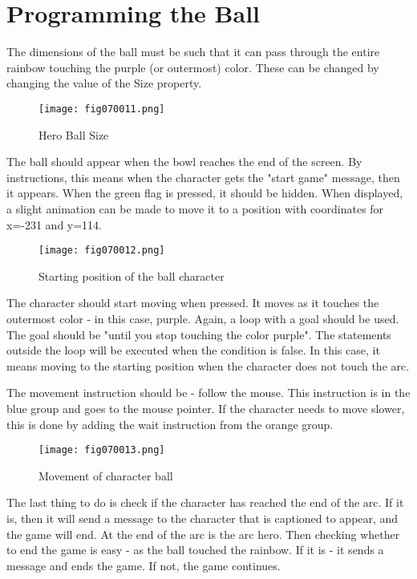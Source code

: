\section{Programming the Ball}
The dimensions of the ball must be such that it can pass through the entire rainbow touching the purple (or outermost) color. These can be changed by changing the value of the Size property.

\begin{figure}[H]
   \centering
   \texttt{[image: fig070011.png]}
   \caption{Hero Ball Size}
\label{fig070011}
\end{figure}

The ball should appear when the bowl reaches the end of the screen. By instructions, this means when the character gets the "start game" message, then it appears. When the green flag is pressed, it should be hidden. When displayed, a slight animation can be made to move it to a position with coordinates for x=-231 and y=114.

\begin{figure}[H]
   \centering
   \texttt{[image: fig070012.png]}
   \caption{Starting position of the ball character}
\label{fig070012}
\end{figure}

The character should start moving when pressed. It moves as it touches the outermost color - in this case, purple. Again, a loop with a goal should be used. The goal should be "until you stop touching the color purple". The statements outside the loop will be executed when the condition is false. In this case, it means moving to the starting position when the character does not touch the arc.

The movement instruction should be - follow the mouse. This instruction is in the blue group and goes to the mouse pointer. If the character needs to move slower, this is done by adding the wait instruction from the orange group.

\begin{figure}[H]
   \centering
   \texttt{[image: fig070013.png]}
   \caption{Movement of character ball}
\label{fig070013}
\end{figure}

The last thing to do is check if the character has reached the end of the arc. If it is, then it will send a message to the character that is captioned to appear, and the game will end. At the end of the arc is the arc hero. Then checking whether to end the game is easy - as the ball touched the rainbow. If it is - it sends a message and ends the game. If not, the game continues.

